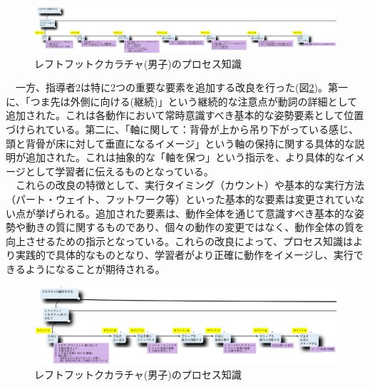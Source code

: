 \begin{figure}[htbp]
    \centering
    \includegraphics[width=1.0\linewidth]{./image/process_knowledge_instructor1_ver2.png}
    \caption{レフトフットクカラチャ(男子)のプロセス知識}
    \label{fig:process_knowledge_instructor1_ver2}
\end{figure}

　一方、指導者2は特に2つの重要な要素を追加する改良を行った(図\ref{fig:process_knowledge_instructor2_ver1})。第一に、「つま先は外側に向ける(継続)」という継続的な注意点が動詞の詳細として追加された。これは各動作において常時意識すべき基本的な姿勢要素として位置づけられている。第二に、「軸に関して：背骨が上から吊り下がっている感じ、頭と背骨が床に対して垂直になるイメージ」という軸の保持に関する具体的な説明が追加された。これは抽象的な「軸を保つ」という指示を、より具体的なイメージとして学習者に伝えるものとなっている。\\
　これらの改良の特徴として、実行タイミング（カウント）や基本的な実行方法（パート・ウェイト、フットワーク等）といった基本的な要素は変更されていない点が挙げられる。追加された要素は、動作全体を通じて意識すべき基本的な姿勢や動きの質に関するものであり、個々の動作の変更ではなく、動作全体の質を向上させるための指示となっている。これらの改良によって、プロセス知識はより実践的で具体的なものとなり、学習者がより正確に動作をイメージし、実行できるようになることが期待される。\\

\begin{figure}[htbp]
    \centering
    \includegraphics[width=1.0\linewidth]{./image/process_knowledge_instructor2_ver1.png}
    \caption{レフトフットクカラチャ(男子)のプロセス知識}
    \label{fig:process_knowledge_instructor2_ver1}
\end{figure}


